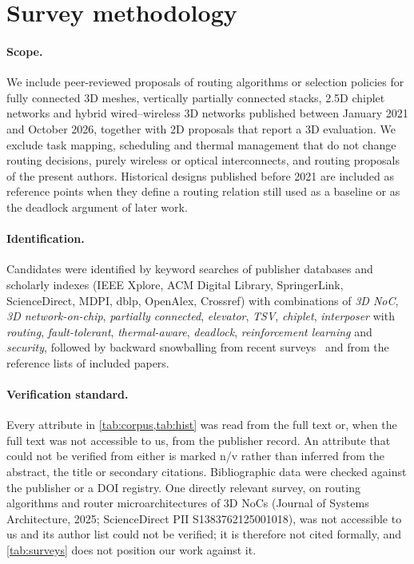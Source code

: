 \section{Survey methodology}
\label{sec:survey-method}

\paragraph{Scope.} We include peer-reviewed proposals of routing algorithms or selection policies for fully connected 3D meshes, vertically partially connected stacks, 2.5D chiplet networks and hybrid wired--wireless 3D networks published between January 2021 and October 2026, together with 2D proposals that report a 3D evaluation. We exclude task mapping, scheduling and thermal management that do not change routing decisions, purely wireless or optical interconnects, and routing proposals of the present authors. Historical designs published before 2021 are included as reference points when they define a routing relation still used as a baseline or as the deadlock argument of later work.

\paragraph{Identification.} Candidates were identified by keyword searches of publisher databases and scholarly indexes (IEEE Xplore, ACM Digital Library, SpringerLink, ScienceDirect, MDPI, dblp, OpenAlex, Crossref) with combinations of \emph{3D NoC}, \emph{3D network-on-chip}, \emph{partially connected}, \emph{elevator}, \emph{TSV}, \emph{chiplet}, \emph{interposer} with \emph{routing}, \emph{fault-tolerant}, \emph{thermal-aware}, \emph{deadlock}, \emph{reinforcement learning} and \emph{security}, followed by backward snowballing from recent surveys~\cite{touati2020survey,kaur2024mapping,muhsen2024review,biglari2024survey,ibarra2026learning,kondoth2026survey} and from the reference lists of included papers.

\paragraph{Verification standard.} Every attribute in \cref{tab:corpus,tab:hist} was read from the full text or, when the full text was not accessible to us, from the publisher record. An attribute that could not be verified from either is marked n/v rather than inferred from the abstract, the title or secondary citations. Bibliographic data were checked against the publisher or a DOI registry. One directly relevant survey, on routing algorithms and router microarchitectures of 3D NoCs (Journal of Systems Architecture, 2025; ScienceDirect PII S1383762125001018), was not accessible to us and its author list could not be verified; it is therefore not cited formally, and \cref{tab:surveys} does not position our work against it.

